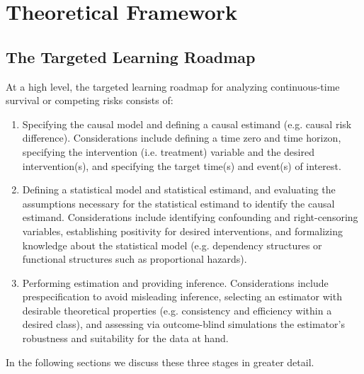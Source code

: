 \documentclass{report}
\newcommand{\1}{\ensuremath{\mathbf{1}}}
\begin{document}
\section{Theoretical Framework}
\label{concepts}
\subsection{The Targeted Learning Roadmap}
\label{TLRoadmap}
At a high level, the targeted learning roadmap for analyzing continuous-time survival or competing risks consists of:
\begin{enumerate}
  \item Specifying the causal model and defining a causal estimand (e.g. causal risk difference). Considerations include defining a time zero and time horizon, specifying the intervention (i.e. treatment) variable and the desired intervention(s), and specifying the target time(s) and event(s) of interest.
  \item Defining a statistical model and statistical estimand, and evaluating the assumptions necessary for the statistical estimand to identify the causal estimand. Considerations include identifying confounding and right-censoring variables, establishing positivity for desired interventions, and formalizing knowledge about the statistical model (e.g. dependency structures or functional structures such as proportional hazards).
  \item Performing estimation and providing inference. Considerations include prespecification to avoid misleading inference, selecting an estimator with desirable theoretical properties (e.g. consistency and efficiency within a desired class), and assessing via outcome-blind simulations the estimator's robustness and suitability for the data at hand.
\end{enumerate}

In the following sections we discuss these three stages in greater detail.
\end{document}
